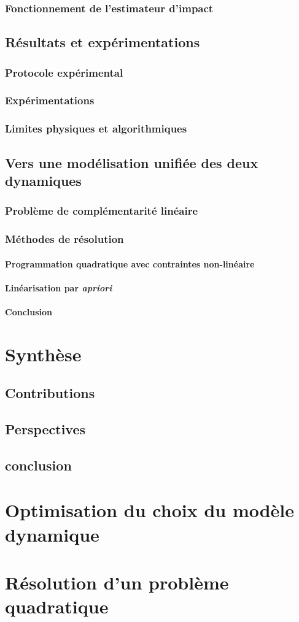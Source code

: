 \documentclass[12pt]{report}
\begin{document}
		\subsection{Fonctionnement de l'estimateur d'impact}
	\section{Résultats et expérimentations}
		\subsection{Protocole expérimental}
		\subsection{Expérimentations}
		\subsection{Limites physiques et algorithmiques}
	\section{Vers une modélisation unifiée des deux dynamiques}
		\subsection{Problème de complémentarité linéaire}
		\subsection{Méthodes de résolution}
			\subsubsection{Programmation quadratique avec contraintes non-linéaire}
			\subsubsection{Linéarisation par \textit{apriori}}
			\subsubsection{Conclusion}
\chapter{Synthèse}
	\section{Contributions}
	\section{Perspectives}
	\section{conclusion}
	


\appendix
\chapter{Optimisation du choix du modèle dynamique}
\chapter{Résolution d'un problème quadratique}
\end{document}
